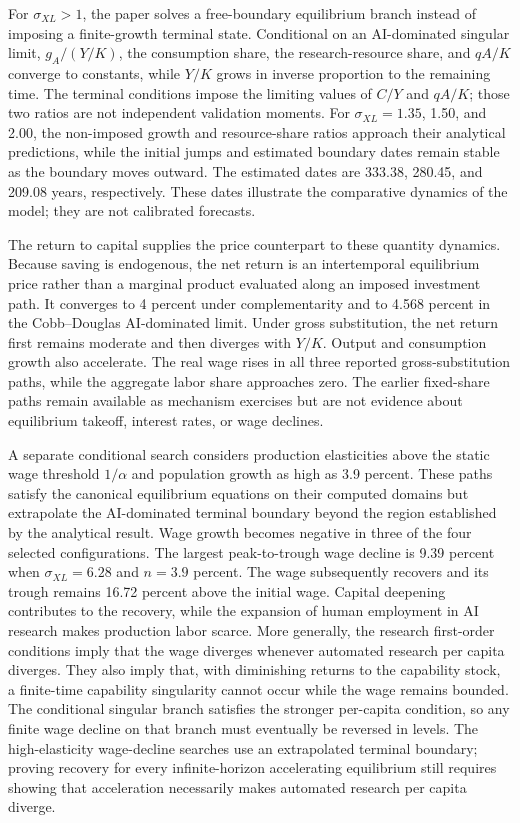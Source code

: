 For $\sigma_{XL}>1$, the paper solves a free-boundary equilibrium branch instead of
imposing a finite-growth terminal state. Conditional on an AI-dominated singular
limit, $g_A/(Y/K)$, the consumption share, the research-resource share, and $qA/K$
converge to constants, while $Y/K$ grows in inverse proportion to the remaining
time. The terminal conditions impose the limiting values of $C/Y$ and $qA/K$;
those two ratios are not independent validation moments. For $\sigma_{XL}=1.35$,
1.50, and 2.00, the non-imposed growth and resource-share ratios approach their
analytical predictions, while the initial jumps and estimated boundary dates remain
stable as the boundary moves outward. The estimated dates are 333.38, 280.45, and 209.08
years, respectively. These dates illustrate the comparative dynamics of the model;
they are not calibrated forecasts.

The return to capital supplies the price counterpart to these quantity dynamics.
Because saving is endogenous, the net return is an intertemporal equilibrium price
rather than a marginal product evaluated along an imposed investment path. It
converges to 4 percent under complementarity and to 4.568 percent in the
Cobb--Douglas AI-dominated limit. Under gross substitution, the net return first
remains moderate and then diverges with $Y/K$. Output and consumption growth also
accelerate. The real wage rises in all three reported gross-substitution paths,
while the aggregate labor share approaches zero. The earlier fixed-share paths
remain available as mechanism exercises but are not evidence about equilibrium
takeoff, interest rates, or wage declines.

A separate conditional search considers production elasticities above the static
wage threshold $1/\alpha$ and population growth as high as 3.9 percent. These paths
satisfy the canonical equilibrium equations on their computed domains but
extrapolate the AI-dominated terminal boundary beyond the region established by the
analytical result. Wage growth becomes negative in three of the four selected
configurations. The largest peak-to-trough wage decline is 9.39 percent when
$\sigma_{XL}=6.28$ and $n=3.9$ percent. The wage subsequently recovers and its trough
remains 16.72 percent above the initial wage. Capital deepening contributes to the
recovery, while the expansion of human employment in AI research makes production
labor scarce. More generally, the research first-order conditions imply that the
wage diverges whenever automated research per capita diverges. They also imply that,
with diminishing returns to the capability stock, a finite-time capability
singularity cannot occur while the wage remains bounded. The conditional singular
branch satisfies the stronger per-capita condition, so any finite wage decline on
that branch must eventually be reversed in levels. The high-elasticity wage-decline
searches use an extrapolated terminal boundary; proving recovery for every
infinite-horizon accelerating equilibrium still requires showing that acceleration
necessarily makes automated research per capita diverge.

